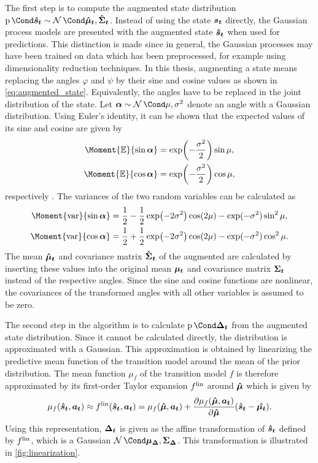 The first step is to compute the augmented state distribution $\Prob{\rv{\hat{s}_t}} \sim \Gaussian{\mat{\hat{\mu}_t}, \mat{\hat{\Sigma}_t}}$.
Instead of using the state $\bm{s_t}$ directly, the Gaussian process models are presented with the augmented state $\bm{\hat{s}_t}$ when used for predictions.
This distinction is made since in general, the Gaussian processes may have been trained on data which has been preprocessed, for example using dimensionality reduction techniques.
In this thesis, augmenting a state means replacing the angles $\varphi$ and $\psi$ by their sine and cosine values as shown in \cref{eq:augmented_state}.
Equivalently, the angles have to be replaced in the joint distribution of the state.
Let $\rv{\alpha} \sim \Gaussian{\mu, \sigma^2}$ denote an angle with a Gaussian distribution.
Using Euler's identity, it can be shown that the expected values of its sine and cosine are given by
\begin{align}
    \Moment{\E}{\sin \rv{\alpha}} &= \exp\!\left( -\frac{\sigma^2}{2} \right)\sin\mu, \\
    \Moment{\E}{\cos \rv{\alpha}} &= \exp\!\left( -\frac{\sigma^2}{2} \right)\cos\mu,
\end{align}
respectively \cite{deisenroth_efficient_2010}.
The variances of the two random variables can be calculated as
\begin{align}
    \Moment{\var}{\sin \rv{\alpha}} &= \frac{1}{2} - \frac{1}{2} \exp\!\left( -2 \sigma^2 \right) \cos(2\mu) - \exp(- \sigma^2) \sin^2\mu, \\
    \Moment{\var}{\cos \rv{\alpha}} &= \frac{1}{2} + \frac{1}{2} \exp\!\left( -2 \sigma^2 \right) \cos(2\mu) - \exp(- \sigma^2) \cos^2\mu.
\end{align}
The mean $\bm{\hat{\mu}_t}$ and covariance matrix $\bm{\hat{\Sigma}_t}$ of the augmented are calculated by inserting these values into the original mean $\bm{\mu_t}$ and covariance matrix $\bm{\Sigma_t}$ instead of the respective angles.
Since the sine and cosine functions are nonlinear, the covariances of the transformed angles with all other variables is assumed to be zero.

The second step in the algorithm is to calculate $\Prob{\rv{\Delta_t}}$ from the augmented state distribution.
Since it cannot be calculated directly, the distribution is approximated with a Gaussian.
This approximation is obtained by linearizing the predictive mean function of the transition model around the mean of the prior distribution.
The mean function $\mu_f$ of the transition model $f$ is therefore approximated by its first-order Taylor expansion $f^{\text{lin}}$ around $\bm{\hat{\mu}}$ which is given by
\begin{align}
    \mu_f(\bm{\hat{s}_t}, \bm{a_t}) \approx f^{\text{lin}}(\bm{\hat{s}_t}, \bm{a_t}) = \mu_f(\bm{\hat{\mu}}, \bm{a_t}) + \frac{\partial \mu_f(\bm{\hat{\mu}}, \bm{a_t})}{\partial \bm{\hat{\mu}}} (\bm{\hat{s}_t} - \bm{\hat{\mu_t}}).
\end{align}
Using this representation, $\bm{\Delta_t}$ is given as the affine transformation of $\bm{\hat{s}_t}$ defined by $f^{\text{lin}}$, which is a Gaussian $\Gaussian{\mat{\mu_\Delta}, \mat{\Sigma_\Delta}}$.
This transformation is illustrated in \cref{fig:linearization}.


